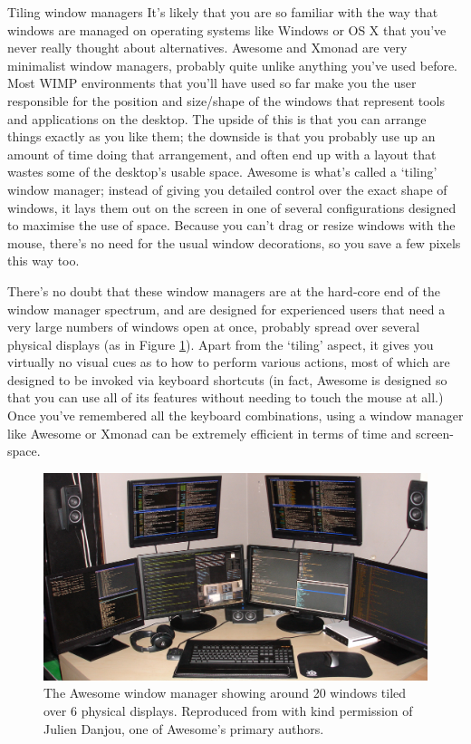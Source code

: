 \begin{diversion}{Tiling window managers}
It's likely that you are so familiar with the way that windows are managed on operating systems like Windows or OS X that you've never really thought about alternatives.
Awesome and Xmonad are very minimalist window managers, probably quite unlike anything you've used before. Most WIMP environments that you'll have used so far make you the user responsible for the position and size/shape of the windows that represent tools and applications on the desktop. The upside of this is that you can arrange things exactly as you like them; the downside is that you probably use up an amount of time doing that arrangement, and often end up with a layout that wastes some of the desktop's usable space. Awesome is what's called a `tiling' window manager; instead of giving you detailed control over the exact shape of windows, it lays them out on the screen in one of several configurations designed to maximise the use of space. Because you can't drag or resize windows with the mouse, there's no need for the usual window decorations, so you save a few pixels this way too.

There's no doubt that these window managers are at the hard-core end of the window manager spectrum, and are designed for experienced users that need a very large numbers of windows open at once, probably spread over several physical displays (as in Figure \ref{figure:awesome}). Apart from the `tiling' aspect, it gives you virtually no visual cues as to how to perform various actions, most of which are designed to be invoked via keyboard shortcuts (in fact, Awesome is designed so that you can use all of its features without needing to touch the mouse at all.) Once you've remembered all the keyboard combinations, using a window manager like Awesome or Xmonad can be extremely efficient in terms of time and screen-space.
\end{diversion}

\begin{figure}[htb]
  \begin{center}
    \includegraphics[width=14cm]{images/awesome.png}
  \end{center}
\caption{The Awesome window manager showing around 20 windows tiled over 6 physical displays. Reproduced from  with kind permission of Julien Danjou, one of Awesome's primary authors.}
\label{figure:awesome}
\end{figure}

